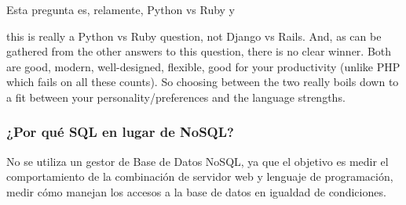 Esta pregunta es, relamente, Python vs Ruby y

 this is really a Python vs Ruby question, not Django vs Rails. And, as can be gathered from the other answers 
 to this question, there is no clear winner. Both are good, modern, well-designed, flexible, good for your
 productivity (unlike PHP which fails on all these counts). So choosing between the two really boils down to
 a fit between your personality/preferences and the language strengths.
\subsubsection{¿Por qué SQL en lugar de NoSQL?}
No se utiliza un gestor de Base de Datos NoSQL, ya que el objetivo es medir el comportamiento de
la combinación de servidor web y lenguaje de programación, medir cómo manejan los accesos a la base 
de datos en igualdad de condiciones.\\
\newpage



